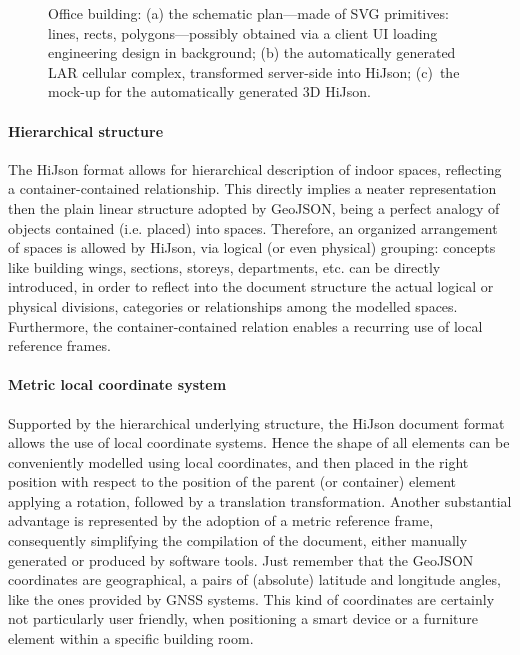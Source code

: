 \documentclass{sig-alternate}
\begin{document}
\begin{figure}[tbh]
\begin{subfigure}[b]{0.22\linewidth}
 \end{subfigure}
 \caption{Office building: 
 (a) the schematic plan---made of SVG primitives: lines, rects, polygons---possibly obtained via a client UI loading engineering design in background;
 (b) the automatically generated LAR cellular complex, transformed server-side into HiJson; 
 (c)~the mock-up for the automatically generated 3D HiJson.
 }
 \label{fig:sogei}
\end{figure}

\paragraph{Hierarchical structure}

The HiJson format allows for hierarchical description of indoor spaces, reflecting a container-contained relationship. This directly implies a neater representation then the plain linear structure adopted by GeoJSON, being a perfect analogy of objects contained (i.e. placed) into spaces.
Therefore, an organized arrangement of spaces is allowed by HiJson, via logical (or even physical) grouping: concepts like building wings, sections, storeys, departments, etc. can be directly introduced, in order to reflect into the document structure the actual logical or physical divisions, categories or relationships among the modelled spaces.
Furthermore, the container-contained relation enables a recurring use of local reference frames.

\paragraph{Metric local coordinate system}

Supported by the hierarchical underlying structure, the HiJson document format allows the use of local coordinate systems. Hence the shape of all elements can be conveniently modelled using local coordinates, and then placed in the right position with respect to the position of the parent (or container) element applying a rotation, followed by a translation transformation.
Another substantial advantage is represented by the adoption of a metric reference frame, consequently simplifying the compilation of the document, either manually generated or produced by software tools. Just remember that the GeoJSON coordinates are geographical, a pairs of (absolute) latitude and longitude angles, like the ones provided by GNSS systems. This kind of coordinates are certainly not particularly user friendly, when positioning a smart device or a furniture element within a specific building room.
\end{document}
